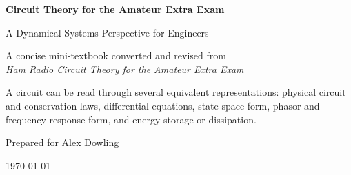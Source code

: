 \begin{titlepage}
\centering
\vspace*{0.8in}
{\Huge\bfseries Circuit Theory for the Amateur Extra Exam\par}
\vspace{0.35in}
{\Large A Dynamical Systems Perspective for Engineers\par}
\vspace{0.8in}
{\large A concise mini-textbook converted and revised from\\
\emph{Ham Radio Circuit Theory for the Amateur Extra Exam}\par}
\vfill
\begin{tcolorbox}[width=0.82\textwidth,colback=white,colframe=GuideBlue,title=\textbf{Central Framework}]
A circuit can be read through several equivalent representations:
physical circuit and conservation laws, differential equations, state-space form,
phasor and frequency-response form, and energy storage or dissipation.
\end{tcolorbox}
\vfill
{\large Prepared for Alex Dowling\par}
{\large \today\par}
\end{titlepage}

